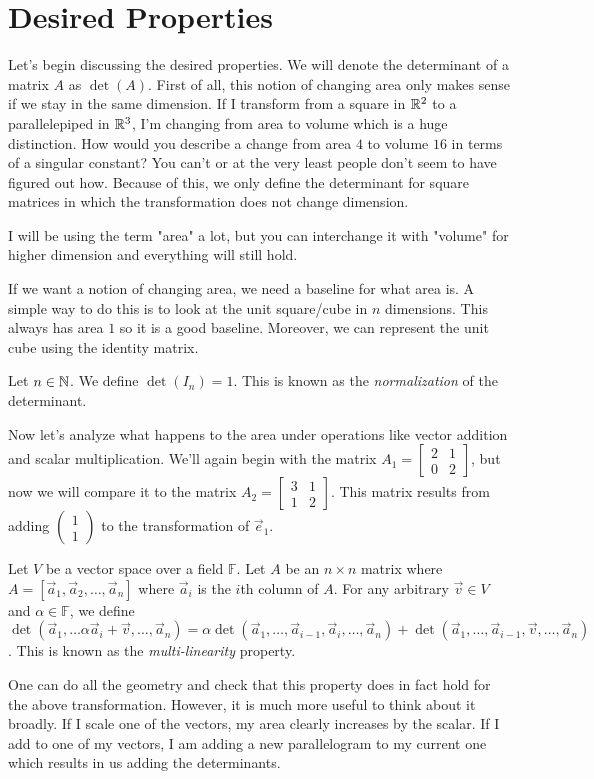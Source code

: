 \section{Desired Properties}
Let's begin discussing the desired properties. We will denote the determinant of a matrix $A$ as $\det(A)$. First of all, this notion of changing area only makes sense if we stay in the same dimension. If I transform from a square in $\mathbb{R}^2$ to a parallelepiped in $\mathbb{R}^3$, I'm changing from area to volume which is a huge distinction. How would you describe a change from area $4$ to volume $16$ in terms of a singular constant? You can't or at the very least people don't seem to have figured out how. Because of this, we only define the determinant for square matrices in which the transformation does not change dimension.
\begin{remark}
    I will be using the term "area" a lot, but you can interchange it with "volume" for higher dimension and everything will still hold.
\end{remark}
If we want a notion of changing area, we need a baseline for what area is. A simple way to do this is to look at the unit square/cube in $n$ dimensions. This always has area $1$ so it is a good baseline. Moreover, we can represent the unit cube using the identity matrix.
\begin{definition}
    Let $n\in\mathbb{N}$. We define $\det(I_n)=1$. This is known as the \textit{normalization} of the determinant.
\end{definition}
Now let's analyze what happens to the area under operations like vector addition and scalar multiplication. We'll again begin with the matrix $A_1=\begin{bmatrix}
    2 & 1 \\ 0 & 2
\end{bmatrix}$, but now we will compare it to the matrix $A_2=\begin{bmatrix}
    3 & 1 \\ 1 & 2
\end{bmatrix}$. This matrix results from adding $\begin{pmatrix}
    1 \\ 1
\end{pmatrix}$ to the transformation of $\vec{e}_1$.

\begin{definition}
    Let $V$ be a vector space over a field $\mathbb{F}$. Let $A$ be an $n\times n$ matrix where $A=[\vec{a}_1,\vec{a}_2,\dots,\vec{a}_n]$ where $\vec{a}_i$ is the $i$th column of $A$. For any arbitrary $\vec{v}\in V$ and $\alpha\in\mathbb{F}$, we define $\det(\vec{a}_1,\dots\alpha\vec{a}_i+\vec{v},\dots,\vec{a}_n)=\alpha\det(\vec{a}_1,\dots,\vec{a}_{i-1},\vec{a}_i,\dots,\vec{a}_n)+\det(\vec{a}_1,\dots,\vec{a}_{i-1},\vec{v},\dots,\vec{a}_n)$. This is known as the \textit{multi-linearity} property.
\end{definition}
One can do all the geometry and check that this property does in fact hold for the above transformation. However, it is much more useful to think about it broadly. If I scale one of the vectors, my area clearly increases by the scalar. If I add to one of my vectors, I am adding a new parallelogram to my current one which results in us adding the determinants.

